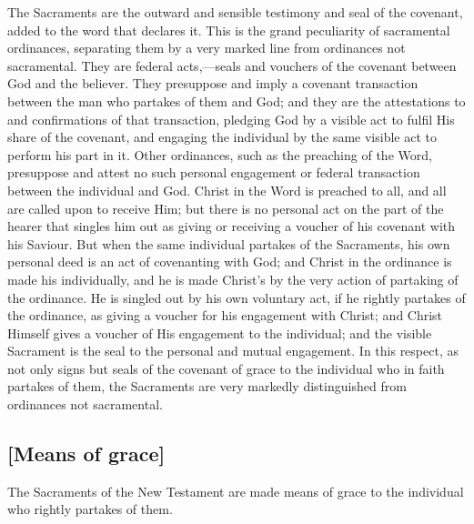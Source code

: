 \documentclass[
  english,
]{book}
\begin{document}
The Sacraments are the outward and sensible testimony and seal of the covenant, added to the word that declares it. This is the grand peculiarity of sacramental ordinances, separating them by a very marked line from ordinances not sacramental. They are federal acts,---seals and vouchers of the covenant between God and the believer. They presuppose and imply a covenant transaction between the man who partakes of them and God; and they are the attestations to and confirmations of that transaction, pledging God by a visible act to fulfil His share of the covenant, and engaging the individual by the same visible act to perform his part in it. Other ordinances, such as the preaching of the Word, presuppose and attest no such personal engagement or federal transaction between the individual and God. Christ in the Word is preached to all, and all are called upon to receive Him; but there is no personal act on the part of the hearer that singles him out as giving or receiving a voucher of his covenant with his Saviour. But when the same individual partakes of the Sacraments, his own personal deed is an act of covenanting with God; and Christ in the ordinance is made his individually, and he is made Christ's by the very action of partaking of the ordinance. He is singled out by his own voluntary act, if he rightly partakes of the ordinance, as giving a voucher for his engagement with Christ; and Christ Himself gives a voucher of His engagement to the individual; and the visible Sacrament is the seal to the personal and mutual engagement. In this respect, as not only signs but seals of the covenant of grace to the individual who in faith partakes of them, the Sacraments are very markedly distinguished from ordinances not sacramental.

\hypertarget{means-of-grace}{%
\subsection{{[}Means of grace{]}}\label{means-of-grace}}

The Sacraments of the New Testament are made means of grace to the individual who rightly partakes of them.
\end{document}
